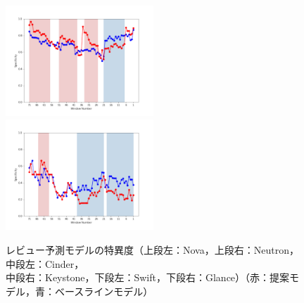 \documentclass[submit]{ipsj}
\begin{document}
\begin{figure}[t]
\begin{minipage}{\textwidth}
\begin{center}
    \includegraphics[width=0.495\textwidth]{Uenaka_fig/RQ2_result/Swift/Swift_review_Specificity.pdf}
    \includegraphics[width=0.495\textwidth]{Uenaka_fig/RQ2_result/Glance/Glance_review_Specificity.pdf}
    \caption{レビュー予測モデルの特異度（上段左：Nova，上段右：Neutron，中段左：Cinder，\\ 中段右：Keystone，下段左：Swift，下段右：Glance）（赤：提案モデル，青：ベースラインモデル）}
    \label{fig:review_spec}
\end{center}
\vspace{0.08\textheight}
\end{minipage}
\end{figure}
\end{document}
